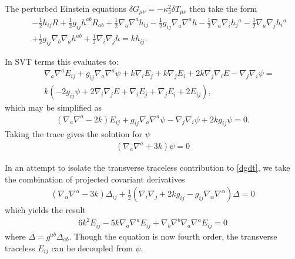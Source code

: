 \documentclass[10pt,letterpaper]{article}
\numberwithin{equation}{section}
\begin{document}
The perturbed Einstein equations  $\delta G_{\mu\nu} =-\kappa_3^2 \delta T_{\mu\nu}$ then take the form
\begin{eqnarray}
&&- \tfrac{1}{2} h_{ij} R
+ \tfrac{1}{2} g_{ij} h^{ab} R_{ab}
+ \tfrac{1}{2} \nabla_{a}\nabla^{a}h_{ij}
-  \tfrac{1}{2} g_{ij} \nabla_{a}\nabla^{a}h
-  \tfrac{1}{2} \nabla_{a}\nabla_{i}h_{j}{}^{a}
-  \tfrac{1}{2} \nabla_{a}\nabla_{j}h_{i}{}^{a}\nonumber\\
&& + \tfrac{1}{2} g_{ij} \nabla_{b}\nabla_{a}h^{ab}
+ \tfrac{1}{2} \nabla_{i}\nabla_{j}h = k h_{ij}.
\end{eqnarray}

In SVT terms this evaluates to:
\begin{eqnarray}
&&\nabla_{a}\nabla^{a}E_{ij}
 +g_{ij} \nabla_{a}\nabla^{a}\psi
 + k \nabla_{i}E_{j}
 + k \nabla_{j}E_{i}
 + 2 k \nabla_{j}\nabla_{i}E
 -  \nabla_{j}\nabla_{i}\psi =
\nonumber \\
&& k (-2 g_{ij}\psi + 2\nabla_i\nabla_j E + \nabla_i E_j + \nabla_j E_i + 2E_{ij}),
\end{eqnarray}
which may be simplified as
\begin{eqnarray}\boxed{
(\nabla_a \nabla^a-2k)E_{ij} + g_{ij}\nabla_a \nabla^a \psi - \nabla_j\nabla_i \psi+2k g_{ij}\psi = 0.
\label{dgdt}}
\end{eqnarray}
Taking the trace gives the solution for $\psi$
\begin{eqnarray}\boxed{
(\nabla_a \nabla^a + 3k)\psi = 0
\label{dgdttr}}
\end{eqnarray} 

In an attempt to isolate the transverse traceless contribution to \eqref{dgdt}, we take the combination of projected covariant derivatives 
\begin{eqnarray}
(\nabla_\alpha\nabla^\alpha - 3k)\Delta_{ij} + \frac12 ( \nabla_i\nabla_j + 2k g_{ij} - g_{ij}\nabla_\alpha\nabla^\alpha )\Delta=0
\end{eqnarray}
which yields the result
\begin{eqnarray}
 \boxed{6 k^2 E_{ij} - 5 k \nabla_{a}\nabla^{a}E_{ij} + \nabla_{b}\nabla^{b}\nabla_{a}\nabla^{a}E_{ij} =0}
 \label{Deintt}
\end{eqnarray}
where $\Delta = g^{ab}\Delta_{ab}$. Though the equation is now fourth order, the transverse traceless $E_{ij}$ can be decoupled from $\psi$. 
\end{document}
